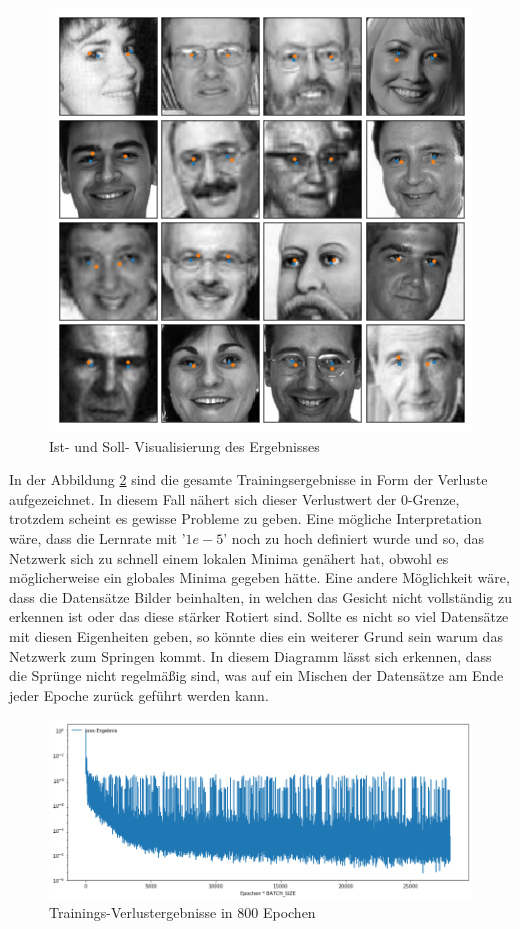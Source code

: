 \begin{figure}
	\centering
	\includegraphics[scale=0.5]{images/epoch-800-full.png}
	\caption{Ist- und Soll- Visualisierung des Ergebnisses}
	\label{fig:resultPic}
\end{figure}
In der Abbildung \ref{fig:lossDiag} sind die gesamte Trainingsergebnisse in Form der Verluste aufgezeichnet. 
In diesem Fall nähert sich dieser Verlustwert der $0$-Grenze, trotzdem scheint es gewisse Probleme zu geben. 
Eine mögliche Interpretation wäre, dass die Lernrate mit '$1e-5$' noch zu hoch definiert wurde und so, das Netzwerk sich zu schnell einem lokalen Minima genähert hat, obwohl es möglicherweise ein globales Minima gegeben hätte. 
Eine andere Möglichkeit wäre, dass die Datensätze Bilder beinhalten, in welchen das Gesicht nicht vollständig zu erkennen ist oder das diese stärker Rotiert sind. 
Sollte es nicht so viel Datensätze mit diesen Eigenheiten geben, so könnte dies ein weiterer Grund sein warum das Netzwerk zum Springen kommt. 
In diesem Diagramm lässt sich erkennen, dass die Sprünge nicht regelmäßig sind, was auf ein Mischen der Datensätze am Ende jeder Epoche zurück geführt werden kann. 
\begin{figure}
	\centering
	\includegraphics[scale=0.4]{images/loss-diagram-all.png}
	\caption{Trainings-Verlustergebnisse in 800 Epochen}
	\label{fig:lossDiag}
\end{figure}

